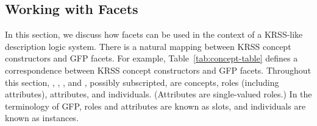 \subsection{Working with Facets}

In this section, we discuss how facets can be used in the context of
a KRSS-like description logic system.
There is a natural mapping between KRSS concept constructors and GFP
facets.  For example, Table~\ref{tab:concept-table} defines a
correspondence between KRSS concept constructors and GFP facets.
Throughout this section, , , , and
, possibly subscripted, are concepts, roles (including
attributes), attributes, and individuals.  (Attributes are
single-valued roles.)  In the terminology of GFP, roles and attributes
are known as slots, and individuals are known as instances.

